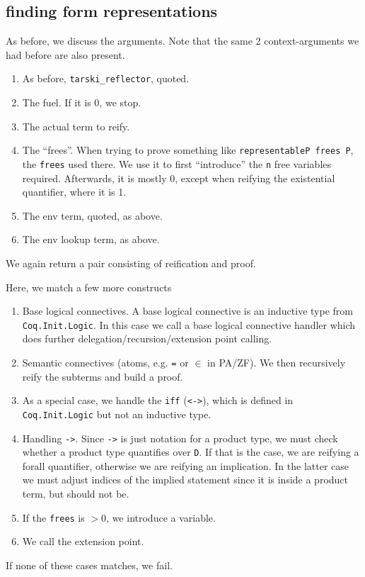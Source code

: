 \documentclass[11pt,a4paper]{article}
\begin{document}
\subsection{finding form representations}
As before, we discuss the arguments. Note that the same 2 context-arguments we had before are also present.
\begin{enumerate}
\item As before, \lstinline|tarski_reflector|, quoted.
\item The fuel. If it is 0, we stop.
\item The actual term to reify.
\item The \enquote{frees}. When trying to prove something like \lstinline|representableP frees P|, the \lstinline|frees| used there. We use it to first \enquote{introduce} the \lstinline|n| free variables required. Afterwards, it is mostly 0, except when reifying the existential quantifier, where it is 1.
\item The env term, quoted, as above.
\item The env lookup term, as above.
\end{enumerate}
We again return a pair consisting of reification and proof.

Here, we match a few more constructs
\begin{enumerate}
	\item Base logical connectives. A base logical connective is an inductive type from \lstinline|Coq.Init.Logic|. In this case we call a base logical connective handler which does further delegation/recursion/extension point calling.
	\item Semantic connectives (atoms, e.g. \lstinline|=| or $\in$ in PA/ZF). We then recursively reify the subterms and build a proof.
	\item As a special case, we handle the \lstinline|iff| (\lstinline|<->|), which is defined in \lstinline|Coq.Init.Logic| but not an inductive type.
	\item Handling \lstinline|->|. Since \lstinline|->| is just notation for a product type, we must check whether a product type quantifies over \lstinline|D|. If that is the case, we are reifying a forall quantifier, otherwise we are reifying an implication. In the latter case we must adjust indices of the implied statement since it is inside a product term, but should not be.
	\item If the \lstinline|frees| is $>0$, we introduce a variable.
	\item We call the extension point.
\end{enumerate}
If none of these cases matches, we fail.
\end{document}
